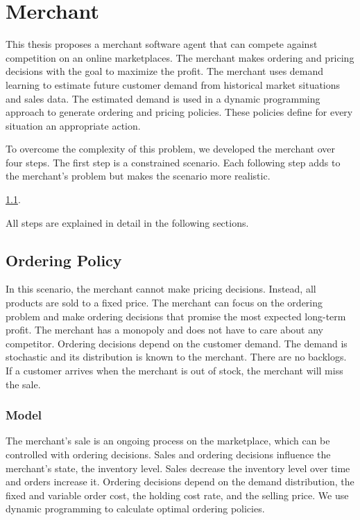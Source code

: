 \chapter{Merchant}
This thesis proposes a merchant software agent that can compete against competition on an online marketplaces.
The merchant makes ordering and pricing decisions with the goal to maximize the profit.
The merchant uses demand learning to estimate future customer demand from historical market situations and sales data.
The estimated demand is used in a dynamic programming approach to generate ordering and pricing policies.
These policies define for every situation an appropriate action.

To overcome the complexity of this problem, we developed the merchant over four steps.
The first step is a constrained scenario.
Each following step adds to the merchant's problem but makes the scenario more realistic.

 \cref{section:ordering_policy}.

All steps are explained in detail in the following sections.

\section{Ordering Policy}
\label{section:ordering_policy}
In this scenario, the merchant cannot make pricing decisions.
Instead, all products are sold to a fixed price.
The merchant can focus on the ordering problem and make ordering decisions that promise the most expected long-term profit.
The merchant has a monopoly and does not have to care about any competitor.
Ordering decisions depend on the customer demand.
The demand is stochastic and its distribution is known to the merchant.
There are no backlogs. %
If a customer arrives when the merchant is out of stock, the merchant will miss the sale.

\subsection{Model}
The merchant's sale is an ongoing process on the marketplace, which can be controlled with ordering decisions.
Sales and ordering decisions influence the merchant's state, the inventory level.
Sales decrease the inventory level over time and orders increase it.
Ordering decisions depend on the demand distribution, the fixed and variable order cost, the holding cost rate, and the selling price.
We use dynamic programming to calculate optimal ordering policies.

